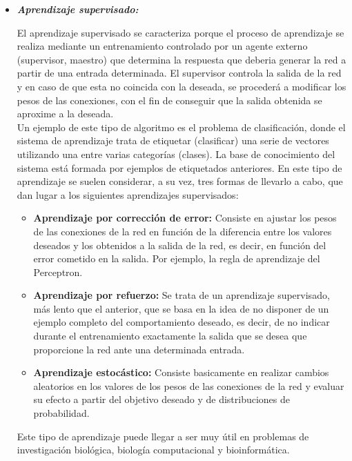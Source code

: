 \documentclass[journal]{IEEEtran}
\begin{document}
\begin{itemize}
\item \textbf{\emph{Aprendizaje supervisado:}}
        
El aprendizaje supervisado se caracteriza porque el proceso de aprendizaje se realiza mediante un entrenamiento controlado por un agente externo (supervisor, maestro) que determina la respuesta que deberia generar la red a partir de una entrada determinada. El supervisor controla la salida de la red y en caso de que esta no coincida con la deseada, se procederá a modificar los pesos de las conexiones, con el fin de conseguir que la salida obtenida se aproxime a la deseada.\\
        
Un ejemplo de este tipo de algoritmo es el problema de clasificación, donde el sistema de aprendizaje trata de etiquetar (clasificar) una serie de vectores utilizando una entre varias categorías (clases). La base de conocimiento del sistema está formada por ejemplos de etiquetados anteriores. En este tipo de aprendizaje se suelen considerar, a su vez, tres formas de llevarlo a cabo, que dan lugar a los siguientes aprendizajes supervisados: \\

\begin{itemize}
\item \textbf{Aprendizaje por corrección de error:}
Consiste en ajustar los pesos de las conexiones de la red en función de la diferencia entre los valores deseados y los obtenidos a la salida de la red, es decir, en función del error cometido en la salida. Por ejemplo, la regla de aprendizaje del Perceptron.\\

\item \textbf{Aprendizaje por refuerzo:}
Se trata de un aprendizaje supervisado, más  lento que el anterior, que se basa en la idea de no disponer de un ejemplo completo del comportamiento deseado, es decir, de no indicar durante el entrenamiento exactamente la salida que se desea que proporcione la red ante una determinada entrada.\\

\item \textbf{Aprendizaje estocástico:}
Consiste basicamente en realizar cambios aleatorios en los valores de los pesos de las conexiones de la red y evaluar su efecto a partir del objetivo deseado y de distribuciones de probabilidad.
\end{itemize}
Este tipo de aprendizaje puede llegar a ser muy útil en problemas de investigación biológica, biología computacional y bioinformática.\\
        

\end{itemize}
\end{document}
